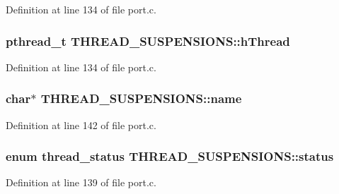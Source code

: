 Definition at line 134 of file port.\-c.

\hypertarget{struct_t_h_r_e_a_d___s_u_s_p_e_n_s_i_o_n_s_a0587fb38462eacbd840ab28a08cb084d}{
\subsubsection[{h\-Thread}]{\setlength{\rightskip}{0pt plus 5cm}pthread\-\_\-t T\-H\-R\-E\-A\-D\-\_\-\-S\-U\-S\-P\-E\-N\-S\-I\-O\-N\-S\-::h\-Thread}}\label{struct_t_h_r_e_a_d___s_u_s_p_e_n_s_i_o_n_s_a0587fb38462eacbd840ab28a08cb084d}


Definition at line 134 of file port.\-c.

\hypertarget{struct_t_h_r_e_a_d___s_u_s_p_e_n_s_i_o_n_s_a67e569bcad7a896eaa92a72fd0659c8e}{
\subsubsection[{name}]{\setlength{\rightskip}{0pt plus 5cm}char$\ast$ T\-H\-R\-E\-A\-D\-\_\-\-S\-U\-S\-P\-E\-N\-S\-I\-O\-N\-S\-::name}}\label{struct_t_h_r_e_a_d___s_u_s_p_e_n_s_i_o_n_s_a67e569bcad7a896eaa92a72fd0659c8e}


Definition at line 142 of file port.\-c.

\hypertarget{struct_t_h_r_e_a_d___s_u_s_p_e_n_s_i_o_n_s_ae22b7147db4527b943e32d42955508eb}{
\subsubsection[{status}]{\setlength{\rightskip}{0pt plus 5cm}enum {\bf thread\-\_\-status} T\-H\-R\-E\-A\-D\-\_\-\-S\-U\-S\-P\-E\-N\-S\-I\-O\-N\-S\-::status}}\label{struct_t_h_r_e_a_d___s_u_s_p_e_n_s_i_o_n_s_ae22b7147db4527b943e32d42955508eb}


Definition at line 139 of file port.\-c.

